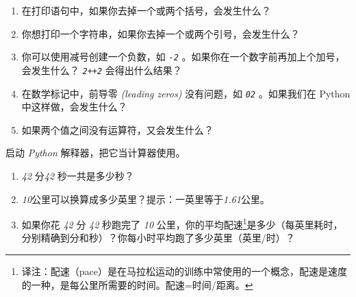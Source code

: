 \begin{exercise}
\begin{enumerate}

\item 在打印语句中，如果你去掉一个或两个括号，会发生什么？

\item 你想打印一个字符串，如果你去掉一个或两个引号，会发生什么？

\item 你可以使用减号创建一个负数，如 {\em \lstinline{-2}} 。如果你在一个数字前再加上个加号，会发生什么？ {\em \lstinline{2++2}} 会得出什么结果？

\item 在数学标记中，前导零 {\em (leading zeros)} 没有问题，如 {\em \lstinline{02}} 。如果我们在 Python 中这样做，会发生什么？

\item 如果两个值之间没有运算符，又会发生什么？

\end{enumerate}

\end{exercise}



\begin{exercise}



启动 {\em Python} 解释器，把它当计算器使用。

\begin{enumerate}

\item {\em 42} 分{\em 42} 秒一共是多少秒？

\item {\em 10}公里可以换算成多少英里？提示：一英里等于{\em 1.61}公里。

\item 如果你花 {\em 42} 分 {\em 42} 秒跑完了 {\em 10} 公里，你的平均配速\footnote{译注：配速（pace）是在马拉松运动的训练中常使用的一个概念，配速是速度的一种，是每公里所需要的时间。配速=时间/距离。}是多少（每英里耗时，分别精确到分和秒）？你每小时平均跑了多少英里（英里/时）？

  
  

\end{enumerate}

\end{exercise}